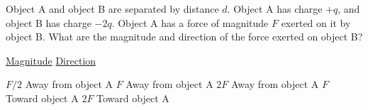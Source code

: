 \begin{questions}\setcounter{question}{30}\question
Object A and object B are separated by distance $d$. Object A has charge $+q$, and object B has charge $-2 q$. Object A has a force of magnitude $F$ exerted on it by object B. What are the magnitude and direction of the force exerted on object B?

\tabto{0.75cm}\underline{Magnitude}
\tabto{4.00cm}\underline{Direction}

\begin{choices}
\choice $F / 2$ \tabto{3.25cm} Away from object A
\choice $F$     \tabto{3.25cm} Away from object A
\choice $2F$    \tabto{3.25cm} Away from object A
\choice $F$     \tabto{3.25cm} Toward object A
\choice $2F$    \tabto{3.25cm} Toward object A
\end{choices}\end{questions}
